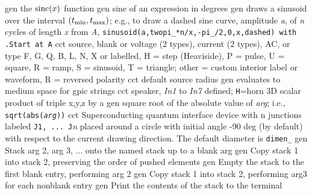   {gen}
  {the $\hbox{sinc}(x)$ function}
  {gen}
  {sine of an expression in degrees}
  {gen}
  {draws a sinusoid over the interval
  $(t_{\hbox{\scriptsize min}}, t_{\hbox{\scriptsize max}})$;
   e.g., to draw a dashed sine curve, amplitude {\sl a}, of {\sl n} cycles
   of length {\sl x} from {\sl A},
   {\tt sinusoid(a,twopi\_*n/x,-pi\_/2,0,x,dashed) with .Start at A}}
  {cct}
  {source, blank or voltage (2 types), current (2 types), AC,
   or type F, G, Q, B, L, N, X or labelled, 
   H = step (Heaviside),
   P = pulse, U = square, R = ramp,
   S = sinusoid, T = triangle; other = custom interior label or waveform,
   R = reversed polarity }
  {cct}
  {default source radius}
  {gen}
  {evaluates to medium space for gpic strings}
  {cct}
  {speaker, {\sl In1} to {\sl In7} defined; {\tt H}=horn
   }
  {3D}
  {scalar product of triple x,y,z by a}
  {gen}
  {square root of the absolute value of {\sl arg}; i.e.,
   {\tt sqrt(abs({\sl arg}))}}
  {cct}
  {Superconducting quantum interface device
   with {\sl }n junctions labeled {\tt J1, ... J}{\sl n}
   placed around a circle with initial
   angle -90 deg (by default) with respect
   to the current drawing direction. The
   default diameter is {\tt dimen\_} }
  {gen}
  {Stack arg 2, arg 3, ... onto the named stack up to a blank arg}
  {gen}
  {Copy stack 1 into stack 2, preserving the order of pushed elements}
  {gen}
  {Empty the stack to the first blank entry, performing arg 2}
  {gen}
  {Copy stack 1 into stack 2, performing arg3 for each nonblank entry}
  {gen}
  {Print the contents of the stack to the terminal}
